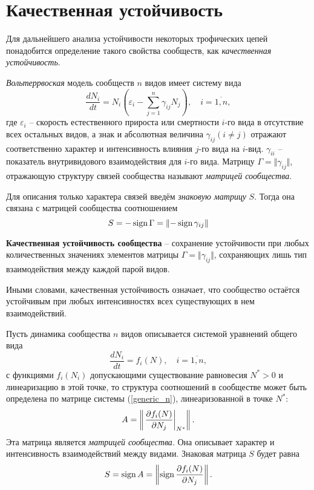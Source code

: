 \section{Качественная устойчивость}
    Для дальнейшего анализа устойчивости некоторых трофических цепей понадобится определение такого свойства сообществ, как \textit{качественная устойчивость}.

    \textit{Вольтеррвоская} модель сообществ \(n\) видов имеет систему вида
    \begin{equation}
        \frac{d N_i}{d t} = N_i \left( \varepsilon_i - \sum_{j=1}^{n} \gamma_{ij} N_j \right), \quad i=\overline{1,n},
    \end{equation}
    где \(\varepsilon_i\) -- скорость естественного прироста или смертности \(i\)-го вида в отсутствие всех остальных видов, а знак и абсолютная величина \(\gamma_{ij} (i \neq j)\) отражают соответственно характер и интенсивность влияния \(j\)-го вида на \(i\)-вид. \(\gamma_{ii}\) -- показатель внутривидового взаимодействия для \(i\)-го вида. Матрицу \(\Gamma = \Vert \gamma_{ij} \Vert\), отражающую структуру связей сообщества называют \textit{матрицей сообщества}.

    Для описания только характера связей введём \textit{знаковую матрицу} \(S\). Тогда она связана с матрицей сообщества соотношением 
    \[
        S = -\operatorname{sign} \Gamma = \left\Vert - \operatorname{sign} \gamma_{ij} \right\Vert
    \]

    \begin{definition}
        \textbf{Качественная устойчивость сообщества} -- сохранение устойчивости при любых количественных значениях элементов матрицы \(\Gamma = \Vert \gamma_{ij} \Vert\), сохраняющих лишь тип взаимодействия между каждой парой видов.
    \end{definition}

    Иными словами, качественная устойчивость означает, что сообщество остаётся устойчивым при любых интенсивностях  всех существующих в нем взаимодействий.

    Пусть динамика сообщества \(n\) видов описывается системой уравнений общего вида
    \begin{equation} \label{generic_n}
        \frac{d N_i}{d t} = f_i(N), \quad i = \overline{1,n},
    \end{equation}
    с функциями \(f_i (N_i)\) допускающими существование равновесия \(N^* > 0\) и линеаризацию в этой точке, то структура соотношений в сообществе может быть определена по матрице системы (\ref{generic_n}), линеаризованной в точке \(N^*\):
    \begin{equation}
        A = \left\Vert \left. \frac{\partial f_i (N)}{\partial N_j} \right|_{N^*} \right\Vert.
    \end{equation}
    Эта матрица является \textit{матрицей сообщества}. Она описывает характер и интенсивность взаимодействий между видами. Знаковая матрица \(S\) будет равна
    \begin{equation} \label{sign_partial}
        S = \operatorname{sign} A = \left\Vert \operatorname{sign} \frac{\partial f_i (N)}{\partial N_j} \right\Vert.
    \end{equation}

